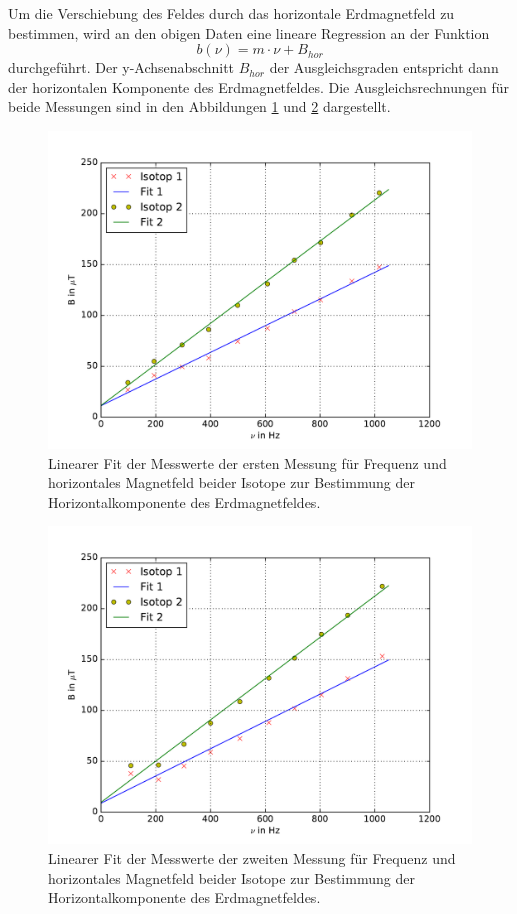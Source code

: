 Um die Verschiebung des Feldes durch das horizontale Erdmagnetfeld zu bestimmen, wird an den obigen Daten eine lineare Regression an der Funktion
\begin{equation*}
  b(\nu) = m\cdot\nu + B_{hor}
\end{equation*}
durchgeführt.
Der y-Achsenabschnitt $B_{hor}$ der Ausgleichsgraden entspricht dann der horizontalen Komponente des Erdmagnetfeldes.
Die Ausgleichsrechnungen für beide Messungen sind in den Abbildungen \ref{fig:Bfeldfit1} und \ref{fig:Bfeldfit2} dargestellt.

\begin{figure}[H]
  \centering
  \includegraphics[width=\textwidth]{plots/Bfeldfit1}
  \caption{Linearer Fit der Messwerte der ersten Messung für Frequenz und horizontales Magnetfeld beider Isotope zur Bestimmung der Horizontalkomponente des Erdmagnetfeldes.}
  \label{fig:Bfeldfit1}
\end{figure}
\begin{figure}[H]
  \centering
  \includegraphics[width=\textwidth]{plots/Bfeldfit2}
  \caption{Linearer Fit der Messwerte der zweiten Messung für Frequenz und horizontales Magnetfeld beider Isotope zur Bestimmung der Horizontalkomponente des Erdmagnetfeldes.}
  \label{fig:Bfeldfit2}
\end{figure}
